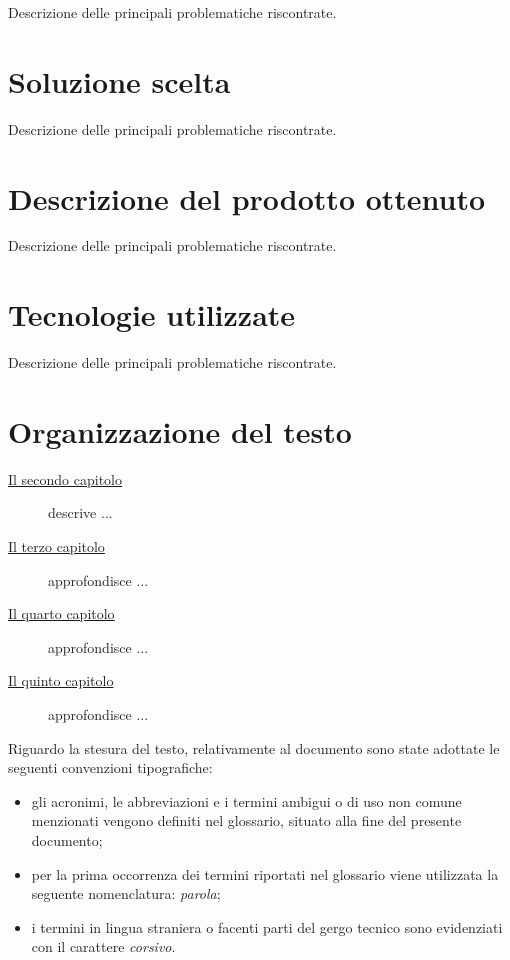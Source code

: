 Descrizione delle principali problematiche riscontrate.

\section{Soluzione scelta}

Descrizione delle principali problematiche riscontrate.

\section{Descrizione del prodotto ottenuto}

Descrizione delle principali problematiche riscontrate.

\section{Tecnologie utilizzate}

Descrizione delle principali problematiche riscontrate.

\section{Organizzazione del testo}

\begin{description}
    \item[{\hyperref[cap:analisi-requisiti]{Il secondo capitolo}}] descrive ...
    
    \item[{\hyperref[cap:progettazione]{Il terzo capitolo}}] approfondisce ...
    
    \item[{\hyperref[cap:realizzazione-e-testing]{Il quarto capitolo}}] approfondisce ...
    
    \item[{\hyperref[cap:conclusioni]{Il quinto capitolo}}] approfondisce ...
\end{description}

Riguardo la stesura del testo, relativamente al documento sono state adottate le seguenti convenzioni tipografiche:
\begin{itemize}
	\item gli acronimi, le abbreviazioni e i termini ambigui o di uso non comune menzionati vengono definiti nel glossario, situato alla fine del presente documento;
	\item per la prima occorrenza dei termini riportati nel glossario viene utilizzata la seguente nomenclatura: \emph{parola}\glsfirstoccur;
	\item i termini in lingua straniera o facenti parti del gergo tecnico sono evidenziati con il carattere \emph{corsivo}.
\end{itemize}